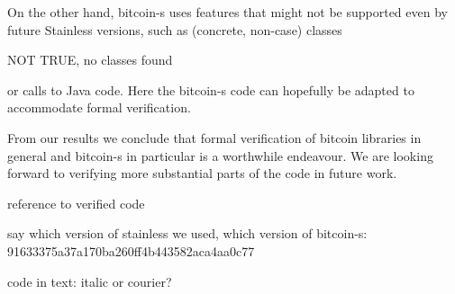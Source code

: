 \documentclass[runningheads]{llncs}
\newcommand{\todo}[1]{{\par \color{red}#1}}
\begin{document}
On the other hand, bitcoin-s uses features that might not be supported
even by future Stainless versions, such as (concrete, non-case)
classes \todo{NOT TRUE, no classes found} or calls to Java code. Here
the bitcoin-s code can hopefully be adapted to accommodate formal
verification.

From our results we conclude that formal verification of bitcoin
libraries in general and bitcoin-s in particular is a worthwhile
endeavour. We are looking forward to verifying more substantial parts
of the code in future work.





\todo{reference to verified code} \todo{say which version of stainless
  we used, which version of bitcoin-s:
  91633375a37a170ba260ff4b443582aca4aa0c77 }

\todo{code in text: italic or courier?}


\clearpage
\appendix
\end{document}
